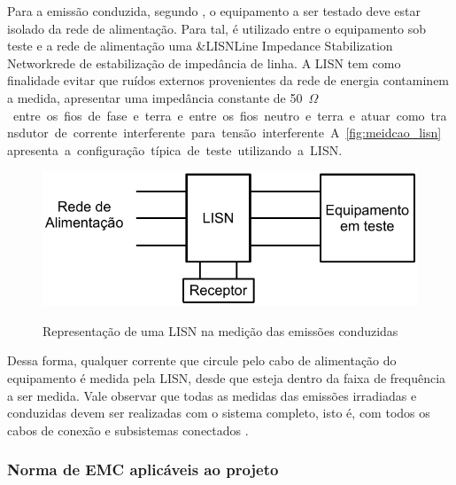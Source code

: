             Para a emissão conduzida, segundo , o equipamento a ser testado deve estar isolado da rede de alimentação. Para tal, é utilizado entre o equipamento sob teste e a rede de alimentação uma \abreviatura&{LISN}{Line Impedance Stabilization Network}{rede de estabilização de impedância de linha}. A LISN tem como finalidade evitar que ruídos externos provenientes da rede de energia contaminem a medida, apresentar uma impedância constante de \qty{50}{$\Omega$} entre os fios de fase e terra e entre os fios neutro e terra e atuar como transdutor de corrente interferente para tensão interferente. A \autoref{fig:meidcao_lisn} apresenta a configuração típica de teste utilizando a LISN. 
            
            \begin{figure}[H]
            	\centering
            	\caption{Representação de uma LISN na medição das emissões conduzidas}
            	\includegraphics[scale=1]{pdf/outros/lisn_modelo.pdf}
            	\label{fig:meidcao_lisn}
            \end{figure}
            
            Dessa forma, qualquer corrente que circule pelo cabo de alimentação do equipamento é medida pela LISN, desde que esteja dentro da faixa de frequência a ser medida. Vale observar que todas as medidas das emissões irradiadas e conduzidas devem ser realizadas com o sistema completo, isto é, com todos os cabos de conexão e subsistemas conectados \cite{ref:EMC_phd_schlichting}.
            
            
            \subsubsection{Norma de EMC aplicáveis ao projeto} \label{cap:fund_emc_norma_proj}
            
